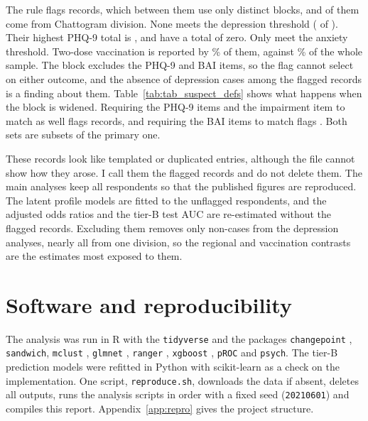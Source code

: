 The rule flags \SuspectN{} records, which between them use only \SuspectPatterns{} distinct blocks, and \SuspectChatto{} of them come from Chattogram division. None meets the depression threshold (\SuspectDep{} of \SuspectN). Their highest PHQ-9 total is \SuspectMaxPhq, and \SuspectPhqZero{} have a total of zero. Only \SuspectAnx{} meet the anxiety threshold. Two-dose vaccination is reported by \SuspectTwoDose\% of them, against \MhTwoDose\% of the whole sample. The block excludes the PHQ-9 and BAI items, so the flag cannot select on either outcome, and the absence of depression cases among the flagged records is a finding about them. Table~\ref{tab:tab_suspect_defs} shows what happens when the block is widened. Requiring the PHQ-9 items and the impairment item to match as well flags \SuspectAltPhq{} records, and requiring the BAI items to match flags \SuspectAltBai. Both sets are subsets of the primary one.


These records look like templated or duplicated entries, although the file cannot show how they arose. I call them the flagged records and do not delete them. The main analyses keep all \MhN{} respondents so that the published figures are reproduced. The latent profile models are fitted to the \GmmN{} unflagged respondents, and the adjusted odds ratios and the tier-B test AUC are re-estimated without the flagged records. Excluding them removes only non-cases from the depression analyses, nearly all from one division, so the regional and vaccination contrasts are the estimates most exposed to them.

\section{Software and reproducibility}
The analysis was run in R \parencite{ihaka1996} with the \texttt{tidyverse} \parencite{wickham2019,wickham2016} and the packages \texttt{changepoint} \parencite{killick2012}, \texttt{sandwich}, \texttt{mclust} \parencite{scrucca2016}, \texttt{glmnet} \parencite{friedman2010}, \texttt{ranger} \parencite{wright2017}, \texttt{xgboost} \parencite{chen2016}, \texttt{pROC} \parencite{robin2011} and \texttt{psych}. The tier-B prediction models were refitted in Python with scikit-learn \parencite{pedregosa2011} as a check on the implementation. One script, \texttt{reproduce.sh}, downloads the data if absent, deletes all outputs, runs the analysis scripts in order with a fixed seed (\texttt{20210601}) and compiles this report. Appendix~\ref{app:repro} gives the project structure.

